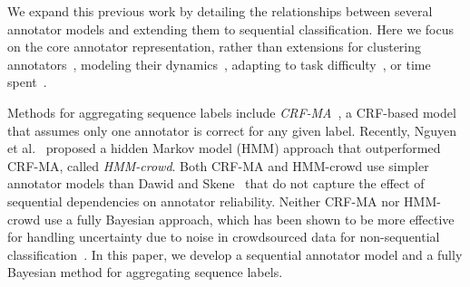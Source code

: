 We expand this previous work by detailing the relationships between several annotator models
and extending them to sequential classification. 
Here we focus on the core annotator representation, rather than extensions 
for clustering annotators~\cite{venanzi2014community,moreno_bayesian_2015},
modeling their dynamics~\cite{simpsonlong},
adapting to task difficulty~\cite{whitehill2009whose,bachrach2012grade},
or time spent~\cite{venanzi2016time}.

Methods for aggregating sequence labels 
include \emph{CRF-MA}~\cite{rodrigues2014sequence},
a CRF-based model that assumes only one annotator is correct for any given label.
Recently, Nguyen et al.~ proposed a hidden Markov model (HMM) approach that outperformed CRF-MA, called \emph{HMM-crowd}.
Both CRF-MA and HMM-crowd use simpler annotator models than Dawid and Skene~
that do not capture the effect of sequential dependencies on annotator reliability.
Neither CRF-MA nor HMM-crowd use a fully Bayesian approach,
which has been shown to be more effective for handling uncertainty
due to noise in crowdsourced data for non-sequential classification~\cite{kim2012bayesian,simpsonlong,venanzi2014community,moreno_bayesian_2015}.
In this paper, we develop a sequential annotator model and a fully Bayesian method for aggregating sequence labels.  %

